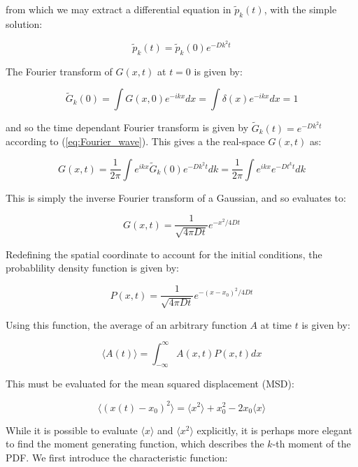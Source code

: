 \documentclass[11pt, a4paper]{article} %
\begin{document}
\begin{appendices}
from which we may extract a differential equation in $\tilde{p}_{k}(t)$, with the simple solution:

\begin{equation} \label{eq:Fourier_wave}
\tilde{p}_{k}(t) = \tilde{p}_{k}(0)e^{-Dk^{2}t}
\end{equation}

The Fourier transform of $G(x,t)$ at $t=0$ is given by:

\begin{equation}
\tilde{G}_{k}(0) = \int G(x,0)e^{-ikx}dx = \int \delta(x)e^{-ikx}dx = 1
\end{equation}

and so the time dependant Fourier transform is given by $\tilde{G}_{k}(t) = e^{-Dk^{2}t}$ according to (\ref{eq:Fourier_wave}). This gives a the real-space $G(x,t)$ as:

\begin{equation}
G(x,t) = \frac{1}{2\pi} \int e^{ikx} \tilde{G}_{k}(0)e^{-Dk^{2}t}dk = \frac{1}{2\pi} \int e^{ikx} e^{-Dt^{k}t}dk
\end{equation}

This is simply the inverse Fourier transform of a Gaussian, and so evaluates to:

\begin{equation}
G(x,t) = \frac{1}{\sqrt{4\pi Dt}}e^{-x^{2}/4Dt}
\end{equation}

Redefining the spatial coordinate to account for the initial conditions, the probablility density function is given by:

\begin{equation}
P(x,t) = \frac{1}{\sqrt{4\pi Dt}}e^{-(x-x_{0})^{2}/4Dt}
\end{equation}

Using this function, the average of an arbitrary function $A$ at time $t$ is given by:

\begin{equation}
\langle A(t) \rangle = \int_{-\infty}^{\infty} A(x,t)P(x,t) dx
\end{equation}

This must be evaluated for the mean squared displacement (MSD):

\begin{equation} \label{eq:MSD_theory} 
\langle (x(t) - x_{0})^{2} \rangle = \langle x^2 \rangle + x_{0}^{2} -2x_{0}\langle x \rangle 
\end{equation}

 
While it is possible to evaluate $\langle x \rangle$ and $\langle x^2 \rangle$ explicitly, it is perhaps more elegant to find the moment generating function, which describes the $k$-th moment of the PDF. We first introduce the characteristic function:


\end{appendices}
\end{document}
